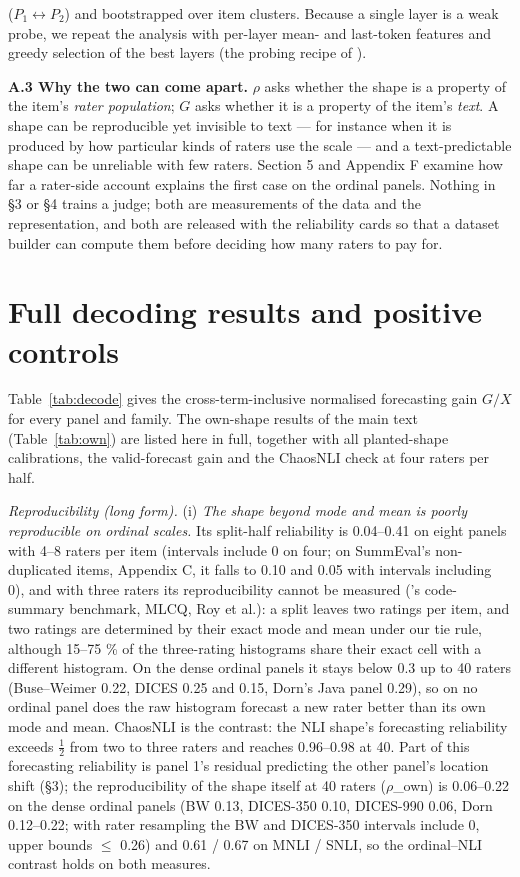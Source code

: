 \documentclass[10pt,twocolumn]{article}
\begin{document}
(\(P_1\leftrightarrow P_2\)) and bootstrapped over item clusters. Because a single layer is a weak probe, we repeat the analysis with per-layer mean- and last-token features and greedy selection of the best layers (the probing recipe of \citealp{li2026rethinking}).

\textbf{A.3 Why the two can come apart.} \(\rho\) asks whether the shape is a property of the item's \emph{rater population}; \(G\) asks whether it is a property of the item's \emph{text}. A shape can be reproducible yet invisible to text --- for instance when it is produced by how particular kinds of raters use the scale --- and a text-predictable shape can be unreliable with few raters. Section 5 and Appendix F examine how far a rater-side account explains the first case on the ordinal panels. Nothing in \S{}3 or \S{}4 trains a judge; both are measurements of the data and the representation, and both are released with the reliability cards so that a dataset builder can compute them before deciding how many raters to pay for.

\section{Full decoding results and positive controls}


Table~\ref{tab:decode} gives the cross-term-inclusive normalised forecasting gain \(G/X\) for every panel and family. The own-shape results of the main text (Table~\ref{tab:own}) are listed here in full, together with all planted-shape calibrations, the valid-forecast gain and the ChaosNLI check at four raters per half.

\emph{Reproducibility (long form).} (i) \emph{The shape beyond mode and mean is poorly reproducible on ordinal scales.} Its split-half reliability is 0.04--0.41 on eight panels with 4--8 raters per item (intervals include 0 on four; on SummEval's non-duplicated items, Appendix C, it falls to 0.10 and 0.05 with intervals including 0), and with three raters its reproducibility cannot be measured (\citet{crupi2025effectiveness}'s code-summary benchmark, MLCQ, Roy et al.): a split leaves two ratings per item, and two ratings are determined by their exact mode and mean under our tie rule, although 15--75 \% of the three-rating histograms share their exact cell with a different histogram. On the dense ordinal panels it stays below 0.3 up to 40 raters (Buse--Weimer 0.22, DICES 0.25 and 0.15, Dorn's Java panel 0.29), so on no ordinal panel does the raw histogram forecast a new rater better than its own mode and mean. ChaosNLI is the contrast: the NLI shape's forecasting reliability exceeds $\tfrac12$ from two to three raters and reaches 0.96--0.98 at 40. Part of this forecasting reliability is panel 1's residual predicting the other panel's location shift (\S{}3); the reproducibility of the shape itself at 40 raters ($\rho$\_own) is 0.06--0.22 on the dense ordinal panels (BW 0.13, DICES-350 0.10, DICES-990 0.06, Dorn 0.12--0.22; with rater resampling the BW and DICES-350 intervals include 0, upper bounds $\leq$ 0.26) and 0.61 / 0.67 on MNLI / SNLI, so the ordinal--NLI contrast holds on both measures.
\end{document}
